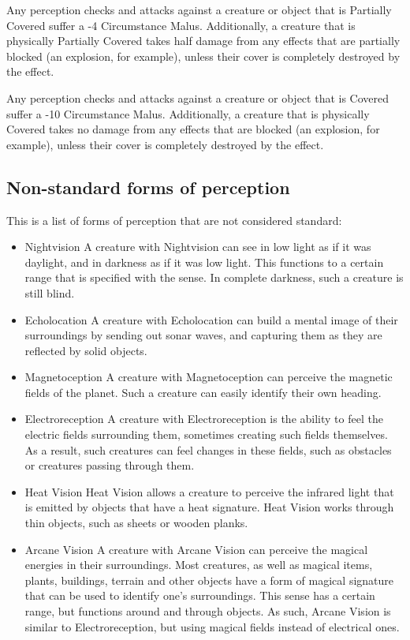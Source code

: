 Any perception checks and attacks against a creature or object that is Partially Covered suffer a -4 Circumstance Malus.
Additionally, a creature that is physically Partially Covered takes half damage from any effects that are partially blocked (an explosion, for example), unless their cover is completely destroyed by the effect.

Any perception checks and attacks against a creature or object that is Covered suffer a -10 Circumstance Malus.
Additionally, a creature that is physically Covered takes no damage from any effects that are blocked (an explosion, for example), unless their cover is completely destroyed by the effect.

\subsection{Non-standard forms of perception}\label{subsec:otherSenses}
This is a list of forms of perception that are not considered standard:
\begin{itemize}
	\item Nightvision
	A creature with Nightvision can see in low light as if it was daylight, and in darkness as if it was low light.
	This functions to a certain range that is specified with the sense.
	In complete darkness, such a creature is still blind.

	\item Echolocation
	A creature with Echolocation can build a mental image of their surroundings by sending out sonar waves, and capturing them as they are reflected by solid objects.

	\item Magnetoception
	A creature with Magnetoception can perceive the magnetic fields of the planet.
	Such a creature can easily identify their own heading.

	\item Electroreception
	A creature with Electroreception is the ability to feel the electric fields surrounding them, sometimes creating such fields themselves.
	As a result, such creatures can feel changes in these fields, such as obstacles or creatures passing through them.

	\item Heat Vision
	Heat Vision allows a creature to perceive the infrared light that is emitted by objects that have a heat signature.
	Heat Vision works through thin objects, such as sheets or wooden planks.

	\item Arcane Vision
	A creature with Arcane Vision can perceive the magical energies in their surroundings.
	Most creatures, as well as magical items, plants, buildings, terrain and other objects have a form of magical signature that can be used to identify one's surroundings.
	This sense has a certain range, but functions around and through objects.
	As such, Arcane Vision is similar to Electroreception, but using magical fields instead of electrical ones.
\end{itemize}